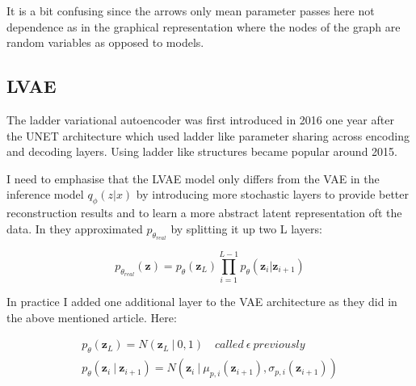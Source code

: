 \documentclass[12pt, english]{article}
\begin{document}
\vspace{4mm}

\par It is a bit confusing since the arrows only mean parameter passes here not dependence as in the graphical representation where the nodes of the graph are random variables as opposed to models. 

\vspace{5mm}

\subsection{LVAE}

\vspace{5mm}

\par The ladder variational autoencoder was first introduced in 2016 \cite{sonderby2016ladder} one year after the UNET \cite{ronneberger2015u} architecture which used ladder like parameter sharing across encoding and decoding layers. Using ladder like structures became popular around 2015.

\vspace{4mm}

\par I need to emphasise that the LVAE model only differs from the VAE in the inference model $q_{\phi} (z | x)$ by introducing more stochastic layers to provide better reconstruction results and to learn a more abstract latent representation oft the data. In \cite{sonderby2016ladder} they approximated $p_{\theta_{real}}$ by splitting it up two L layers:

\vspace{4mm}

\begin{equation}
    p_{\theta_{real}}(\bm{z}) =  p_{\theta}(\bm{z}_{L})\prod_{i = 1}^{L - 1}p_{\theta}(\bm{z}_i | \bm{z}_{i+1})
\end{equation}

\vspace{4mm}

\par In practice I added one additional layer to the VAE architecture as they did in the above mentioned article. Here:

\vspace{4mm}

\begin{gather*}
    p_{\theta}(\bm{z}_L) = N(\bm{z}_L  ~ | ~ 0, 1) \quad called\ \epsilon\ previously\\
    p_{\theta}(\bm{z}_i ~ | ~ \bm{z}_{i+1}) = N(\bm{z}_i ~ |  ~ \mu_{p,i}(\bm{z}_{i+1}), \sigma_{p, i}(\bm{z}_{i+1}))
\end{gather*}
\end{document}
